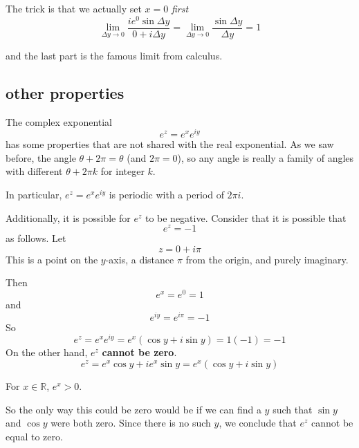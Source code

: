 \documentclass[11pt, oneside]{article}
\begin{document}
The trick is that we actually set $x = 0$ \emph{first}
\[ \lim_{\Delta y \rightarrow 0}  \frac{i  e^0 \sin \Delta y}{0 + i \Delta y} = \lim_{\Delta y \rightarrow 0}  \frac{\sin \Delta y}{\Delta y} = 1 \]

and the last part is the famous limit from calculus.

\subsection*{other properties}

The complex exponential 
\[ e^z = e^x e^{iy} \]
has some properties that are not shared with the real exponential.  As we saw before, the angle $\theta + 2 \pi = \theta$ (and $2 \pi = 0$), so any angle is really a family of angles with different $\theta + 2 \pi k$ for integer $k$.

In particular, $e^z = e^x e^{iy}$ is periodic with a period of $2 \pi i$.  

Additionally, it is possible for $e^z$ to be negative.  Consider that it is possible that
\[ e^z = -1 \]
as follows.  Let 
\[ z = 0 + i\pi \]
This is a point on the $y$-axis, a distance $\pi$ from the origin, and purely imaginary.

Then 
\[ e^x = e^0 = 1 \]
and
\[ e^{iy} = e^{i\pi} = -1 \]
So
\[ e^z = e^x e^{iy} = e^x(\cos y + i \sin y) = 1 (-1) = -1 \]
On the other hand, $e^z$ \textbf{cannot be zero}.
\[ e^z = e^x \cos y + i e^x \sin y = e^x(\cos y + i \sin y) \]

For $x \in \mathbb{R}$, $e^x > 0$.

So the only way this could be zero would be if we can find a $y$ such that $\sin y$ and $\cos y$ were both zero.  Since there is no such $y$, we conclude that $e^z$ cannot be equal to zero.
\end{document}
